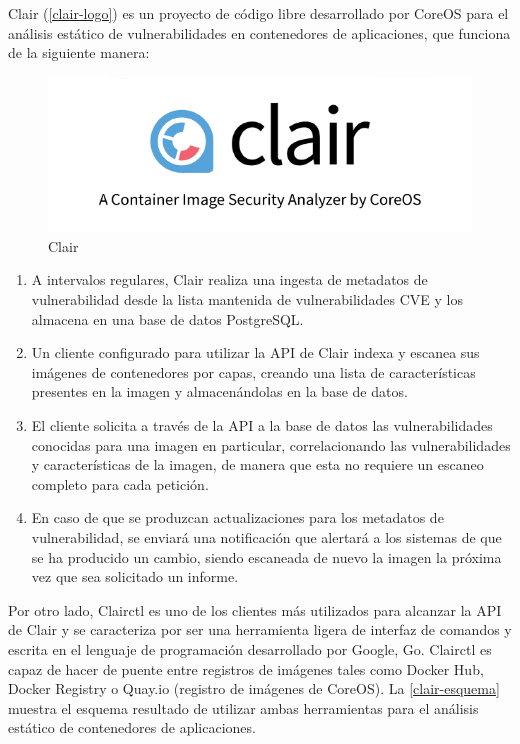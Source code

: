 Clair (\autoref{clair-logo}) es un proyecto de código libre desarrollado por CoreOS para el análisis estático de vulnerabilidades en contenedores de aplicaciones, que funciona de la siguiente manera\cite{clair2017}:

\begin{figure}[htbp]
	\centering
	\includegraphics[width=0.80\linewidth]
	{entorno/figuras/clair.png}
	\caption{Clair}
	\label{clair-logo}
\end{figure}

\begin{enumerate}
	\item A intervalos regulares, Clair realiza una ingesta de metadatos de vulnerabilidad desde la lista mantenida de vulnerabilidades \gls{CVE} y los almacena en una base de datos PostgreSQL.
	\item Un cliente configurado para utilizar la \gls{API} de Clair indexa y escanea sus imágenes de contenedores por capas, creando una lista de características presentes en la imagen y almacenándolas en la base de datos.
	\item El cliente solicita a través de la \gls{API} a la base de datos las vulnerabilidades conocidas para una imagen en particular, correlacionando las vulnerabilidades y características de la imagen, de manera que esta no requiere un escaneo completo para cada petición.
	\item En caso de que se produzcan actualizaciones para los metadatos de vulnerabilidad, se enviará una notificación que alertará a los sistemas de que se ha producido un cambio, siendo escaneada de nuevo la imagen la próxima vez que sea solicitado un informe.
\end{enumerate}

Por otro lado, Clairctl es uno de los clientes más utilizados para alcanzar la \gls{API} de Clair y se caracteriza por ser una herramienta ligera de interfaz de comandos y escrita en el lenguaje de programación desarrollado por Google, Go. Clairctl es capaz de hacer de puente entre registros de imágenes tales como Docker Hub, Docker Registry o Quay.io (registro de imágenes de CoreOS). La \autoref{clair-esquema} muestra el esquema resultado de utilizar ambas herramientas para el análisis estático de contenedores de aplicaciones.


